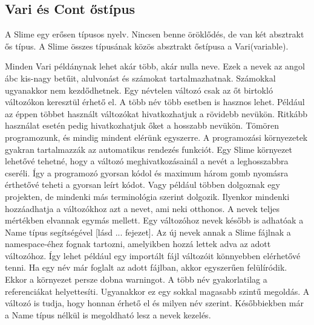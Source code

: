   

\subsection{Vari és Cont őstípus}
A Slime egy erősen típusos nyelv.
Nincsen benne öröklődés, de van két absztrakt ős típus.
A Slime összes típusának közös absztrakt őstípusa a Vari(variable).

Minden Vari példánynak lehet akár több, akár nulla neve.
Ezek a nevek az angol ábc kis-nagy betűit, alulvonást és számokat tartalmazhatnak. 
Számokkal ugyanakkor nem kezdődhetnek.
Egy névtelen változó csak az őt birtokló változókon keresztül érhető el.
A több név több esetben is hasznos lehet.
Például az éppen többet használt változókat hivatkozhatjuk a rövidebb nevükön.
Ritkább használat esetén pedig hivatkozhatjuk őket a hosszabb nevükön.
Tömören programozunk, és mindig mindent elérünk egyszerre.
A programozási környezetek gyakran tartalmazzák az automatikus rendezés funkciót.
Egy Slime környezet lehetővé tehetné, hogy a változó meghivatkozásainál a nevét a leghosszabbra cseréli.
Így a programozó gyorsan kódol és maximum három gomb nyomásra érthetővé teheti a gyorsan leírt kódot.
Vagy például többen dolgoznak egy projekten, de mindenki más terminológia szerint dolgozik.
Ilyenkor mindenki hozzáadhatja a változókhoz azt a nevet, ami neki otthonos.
A nevek teljes mértékben elvannak egymás mellett.
Egy változóhoz nevek később is adhatóak a Name típus segítségével [lásd ... fejezet].
Az új nevek annak a Slime fájlnak a namespace-éhez fognak tartozni, amelyikben hozzá lettek adva az adott változóhoz.
Így lehet például egy importált fájl változóit könnyebben elérhetővé tenni.
Ha egy név már foglalt az adott fájlban, akkor egyszerűen felülíródik.
Ekkor a környezet persze dobna warningot.
A több név gyakorlatilag a referenciákat helyettesíti.
Ugyanakkor ez egy sokkal magasabb szintű megoldás.
A változó is tudja, hogy honnan érhető el és milyen név szerint.
Későbbiekben már a Name típus nélkül is megoldható lesz a nevek kezelés.

